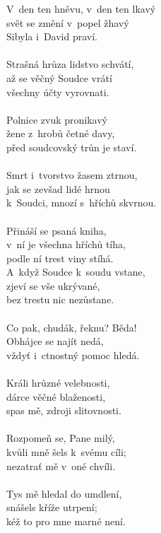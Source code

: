 \begin{translatioMulticol}{4}
V~den ten hněvu, v~den ten lkavý \\
svět se změní v~popel žhavý \\
Sibyla i~David praví. \\
\\
Strašná hrůza lidstvo schvátí, \\
až se věčný Soudce vrátí \\
všechny účty vyrovnati. \\
\\
Polnice zvuk pronikavý \\
žene z~hrobů četné davy, \\
před soudcovský trůn je staví. \\
\\
Smrt i~tvorstvo žasem ztrnou, \\
jak se zevšad lidé hrnou \\
k~Soudci, mnozí s~hříchů skvrnou. \\
\\
Přináší se psaná kniha, \\
v~ní je všechna hříchů tíha, \\
podle ní trest viny stíhá. \\

A~když Soudce k~soudu vstane, \\
zjeví se vše ukrývané, \\
bez trestu nic nezůstane. \\
\\
Co pak, chudák, řeknu? Běda! \\
Obhájce se najít nedá, \\
vždyť i~ctnostný pomoc hledá. \\
\\
Králi hrůzné velebnosti, \\
dárce věčné blaženosti, \\
spas mě, zdroji slitovnosti. \\
\\
Rozpomeň se, Pane milý, \\
kvůli mně šels k~svému cíli; \\
nezatrať mě v~oné chvíli. \\
\\
Tys mě hledal do umdlení, \\
snášels kříže utrpení; \\
kéž to pro mne marné není. \\


\end{translatioMulticol}
